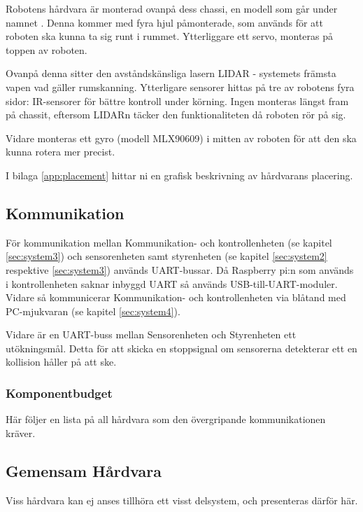 \documentclass[a4paper,11pt]{article}
\begin{document}
\noindent
Robotens hårdvara är monterad ovanpå dess chassi, en modell som går under namnet \cite{terminator}. Denna kommer med fyra hjul påmonterade, som används för att roboten ska kunna ta sig runt i rummet. Ytterliggare ett servo, monteras på toppen av roboten.

Ovanpå denna sitter den avståndskänsliga lasern LIDAR - systemets främsta vapen vad gäller rumskanning. Ytterligare sensorer hittas på tre av robotens fyra sidor: IR-sensorer för bättre kontroll under körning. Ingen monteras längst fram på chassit, eftersom LIDARn täcker den funktionaliteten då roboten rör på sig.

Vidare monteras ett gyro (modell MLX90609) i mitten av roboten för att den ska kunna rotera mer precist.

I bilaga \ref{app:placement} hittar ni en grafisk beskrivning av hårdvarans placering.

\subsection{Kommunikation}
\label{ssec:communication}
För kommunikation mellan Kommunikation- och kontrollenheten (se kapitel \ref{sec:system3}) och sensorenheten samt styrenheten (se kapitel \ref{sec:system2} respektive \ref{sec:system3}) används UART-bussar. Då Raspberry pi:n som används i kontrollenheten saknar inbyggd UART så används USB-till-UART-moduler. Vidare så kommunicerar Kommunikation- och kontrollenheten via blåtand med PC-mjukvaran (se kapitel \ref{sec:system4}).

Vidare är en UART-buss mellan Sensorenheten och Styrenheten ett utökningsmål. Detta för att skicka en stoppsignal om sensorerna detekterar ett en kollision håller på att ske.

\subsubsection{Komponentbudget}
Här följer en lista på all hårdvara som den övergripande kommunikationen kräver.

\begin{center}
\begin{HardwareList}
\end{HardwareList}
\end{center}

\subsection{Gemensam Hårdvara}
Viss hårdvara kan ej anses tillhöra ett visst delsystem, och presenteras därför här.
\end{document}
